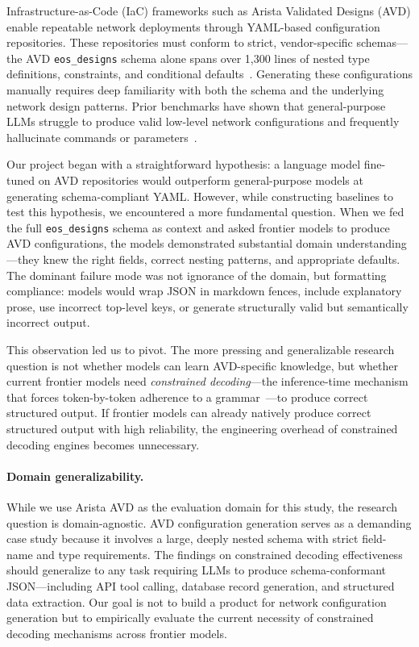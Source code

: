 \documentclass[11pt, letterpaper]{article}
\begin{document}
Infrastructure-as-Code (IaC) frameworks such as Arista Validated Designs (AVD) enable repeatable network deployments through YAML-based configuration repositories. These repositories must conform to strict, vendor-specific schemas---the AVD \texttt{eos\_designs} schema alone spans over 1,300 lines of nested type definitions, constraints, and conditional defaults~\cite{avd_docs}. Generating these configurations manually requires deep familiarity with both the schema and the underlying network design patterns. Prior benchmarks have shown that general-purpose LLMs struggle to produce valid low-level network configurations and frequently hallucinate commands or parameters~\cite{netconfeval, netllmbench}.

Our project began with a straightforward hypothesis: a language model fine-tuned on AVD repositories would outperform general-purpose models at generating schema-compliant YAML. However, while constructing baselines to test this hypothesis, we encountered a more fundamental question. When we fed the full \texttt{eos\_designs} schema as context and asked frontier models to produce AVD configurations, the models demonstrated substantial domain understanding---they knew the right fields, correct nesting patterns, and appropriate defaults. The dominant failure mode was not ignorance of the domain, but formatting compliance: models would wrap JSON in markdown fences, include explanatory prose, use incorrect top-level keys, or generate structurally valid but semantically incorrect output.

This observation led us to pivot. The more pressing and generalizable research question is not whether models can learn AVD-specific knowledge, but whether current frontier models need \emph{constrained decoding}---the inference-time mechanism that forces token-by-token adherence to a grammar~\cite{causal_inference}---to produce correct structured output. If frontier models can already natively produce correct structured output with high reliability, the engineering overhead of constrained decoding engines becomes unnecessary.

\paragraph{Domain generalizability.} While we use Arista AVD as the evaluation domain for this study, the research question is domain-agnostic. AVD configuration generation serves as a demanding case study because it involves a large, deeply nested schema with strict field-name and type requirements. The findings on constrained decoding effectiveness should generalize to any task requiring LLMs to produce schema-conformant JSON---including API tool calling, database record generation, and structured data extraction. Our goal is not to build a product for network configuration generation but to empirically evaluate the current necessity of constrained decoding mechanisms across frontier models.
\end{document}
